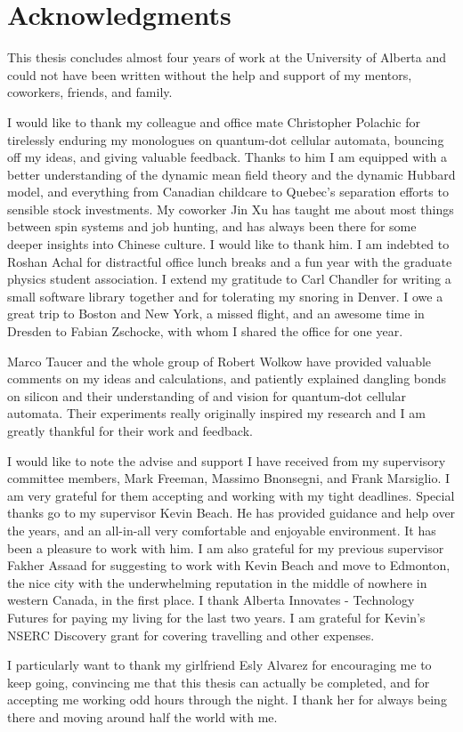 \chapter{Acknowledgments}

This thesis concludes almost four years of work at the University of
Alberta and could not have been written without the help and support of my
mentors, coworkers, friends, and family.

I would like to thank my colleague and office mate Christopher Polachic for
tirelessly enduring my monologues on quantum-dot cellular automata, bouncing off
my ideas, and giving valuable feedback. Thanks to him I am equipped with a
better understanding of the dynamic mean field theory and the dynamic Hubbard
model, and everything from Canadian childcare to Quebec's separation efforts to
sensible stock investments.  My coworker Jin Xu has taught me about most things
between spin systems and job hunting, and has always been there for some deeper
insights into Chinese culture. I would like to thank him. I am indebted to
Roshan Achal for distractful office lunch breaks and a fun year with the
graduate physics student association. I extend my gratitude to Carl Chandler for
writing a small software library together and for tolerating my snoring in
Denver. I owe a great trip to Boston and New York, a missed flight, and an
awesome time in Dresden to Fabian Zschocke, with whom I shared the office for
one year.

Marco Taucer and the whole group of Robert Wolkow have provided valuable
comments on my ideas and calculations, and patiently explained dangling
bonds on silicon and their understanding of and vision for quantum-dot cellular
automata. Their experiments really originally inspired my research and I am
greatly thankful for their work and feedback.

I would like to note the advise and support I have received from my supervisory
committee members, Mark Freeman, Massimo Bnonsegni, and Frank Marsiglio. I am
very grateful for them accepting and working with my tight deadlines. Special
thanks go to my supervisor Kevin Beach. He has provided guidance and help over
the years, and an all-in-all very comfortable and enjoyable environment. It has
been a pleasure to work with him. I am also grateful for my previous supervisor
Fakher Assaad for suggesting to work with Kevin Beach and move to Edmonton, the
nice city with the underwhelming reputation in the middle of nowhere in western
Canada, in the first place. I thank Alberta Innovates - Technology Futures for
paying my living for the last two years. I am grateful for Kevin's NSERC
Discovery grant for covering travelling and other expenses.

I particularly want to thank my girlfriend Esly Alvarez for encouraging me to
keep going, convincing me that this thesis can actually be completed, and for
accepting me working odd hours through the night. I thank her for always being
there and moving around half the world with me.
